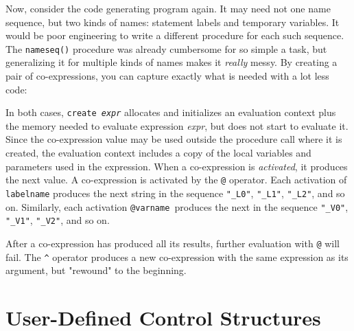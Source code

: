 
Now, consider the code generating program again. It may need not one
name sequence, but two kinds of names: statement labels and
temporary variables. It would be poor engineering to write a different
procedure for each such sequence. The \texttt{nameseq()}
procedure was already cumbersome for so simple a task, but generalizing
it for multiple kinds of names makes it \textit{really} messy. By
creating a pair of co-expressions, you can capture exactly what is
needed with a lot less code:


\noindent
In both cases, \texttt{create}\texttt{
}\texttt{\textit{expr}} allocates and initializes an evaluation context
plus the memory needed to evaluate expression \textit{expr}, but does
not start to evaluate it. Since the co-expression value may be used
outside the procedure call where it is created, the evaluation context
includes a copy of the local variables and parameters used in the
expression. When a co-expression is \textit{activated}, it produces the
next value. A co-expression is activated by the \texttt{@} operator. Each
activation of \texttt{labelname} produces the next string in the
sequence \texttt{"\_L0"},
\texttt{"\_L1"},
\texttt{"\_L2"}, and so on. Similarly, each
activation \texttt{@varname}\texttt{ }produces the next in the sequence
\texttt{"\_V0"},
\texttt{"\_V1"},
\texttt{"\_V2"}, and so on.


After a co-expression has produced all its results, further evaluation
with \texttt{@} will fail. The \texttt{\^{}}
operator produces a new co-expression with the same expression as its
argument, but "rewound" to the beginning.


\section{User-Defined Control Structures}


